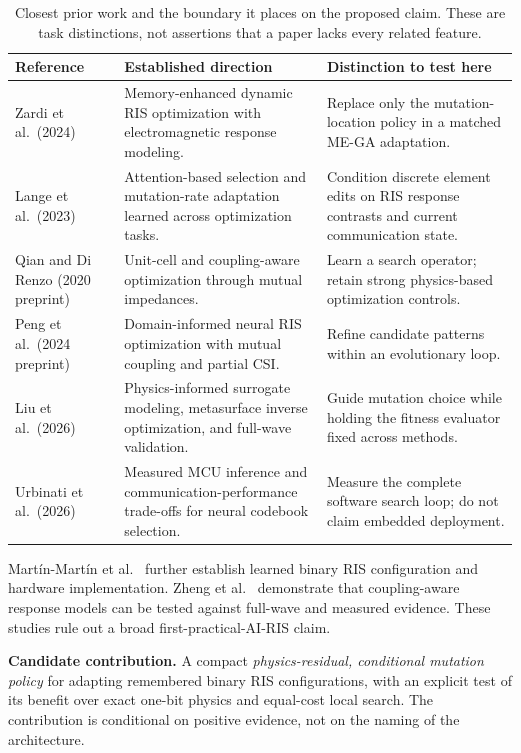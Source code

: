 \documentclass[conference]{IEEEtran}
\begin{document}
\begin{table}[t]
\caption{Closest prior work and the boundary it places on the proposed claim. These are task distinctions, not assertions that a paper lacks every related feature.}
\small
\begin{tabularx}{\linewidth}{@{}p{29mm}YY@{}}
\toprule
Reference & Established direction & Distinction to test here\\
\midrule
Zardi et al.\ (2024) \cite{zardi} & Memory-enhanced dynamic RIS optimization with electromagnetic response modeling. & Replace only the mutation-location policy in a matched ME-GA adaptation.\\
Lange et al.\ (2023) \cite{lange} & Attention-based selection and mutation-rate adaptation learned across optimization tasks. & Condition discrete element edits on RIS response contrasts and current communication state.\\
Qian and Di Renzo (2020 preprint) \cite{qian} & Unit-cell and coupling-aware optimization through mutual impedances. & Learn a search operator; retain strong physics-based optimization controls.\\
Peng et al.\ (2024 preprint) \cite{risnet} & Domain-informed neural RIS optimization with mutual coupling and partial CSI. & Refine candidate patterns within an evolutionary loop.\\
Liu et al.\ (2026) \cite{liu} & Physics-informed surrogate modeling, metasurface inverse optimization, and full-wave validation. & Guide mutation choice while holding the fitness evaluator fixed across methods.\\
Urbinati et al.\ (2026) \cite{urbinati} & Measured MCU inference and communication-performance trade-offs for neural codebook selection. & Measure the complete software search loop; do not claim embedded deployment.\\
\bottomrule
\end{tabularx}
\end{table}

Mart\'in-Mart\'in et al.\ \cite{martin} further establish learned binary RIS configuration and hardware implementation. Zheng et al.\ \cite{zheng} demonstrate that coupling-aware response models can be tested against full-wave and measured evidence. These studies rule out a broad first-practical-AI-RIS claim.

\textbf{Candidate contribution.} A compact \emph{physics-residual, conditional mutation policy} for adapting remembered binary RIS configurations, with an explicit test of its benefit over exact one-bit physics and equal-cost local search. The contribution is conditional on positive evidence, not on the naming of the architecture.
\end{document}
